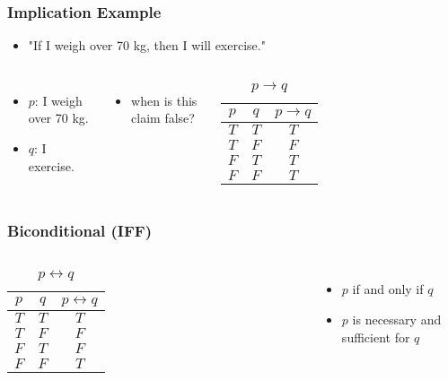 \documentclass[dvipsnames]{beamer}
\begin{document}
\begin{frame}
  \frametitle{Implication Example}

  \begin{itemize}
    \item "If I weigh over 70 kg, then I will exercise."
  \end{itemize}

  \pause
  \begin{columns}
    \begin{itemize}
      \item $p$: I weigh over 70 kg.
      \item $q$: I exercise.
    \end{itemize}

    \pause
    \begin{itemize}
      \item when is this claim false?
    \end{itemize}

    \begin{table}
      \caption{$p \rightarrow q$}
      \begin{tabular}{|c|c||c|}\hline
        $p$ & $q$ & $p \rightarrow q$\\\hline\hline
        $T$ & $T$ & $T$\\\hline
        $T$ & $F$ & $F$\\\hline
        $F$ & $T$ & $T$\\\hline
        $F$ & $F$ & $T$\\\hline
      \end{tabular}
    \end{table}
  \end{columns}
\end{frame}

\begin{frame}
  \frametitle{Biconditional (IFF)}

  \begin{columns}
    \begin{table}
      \caption{$p \leftrightarrow q$}
      \begin{tabular}{|c|c||c|}\hline
        $p$ & $q$ & $p \leftrightarrow q$\\\hline\hline
        $T$ & $T$ & $T$\\\hline
        $T$ & $F$ & $F$\\\hline
        $F$ & $T$ & $F$\\\hline
        $F$ & $F$ & $T$\\\hline
      \end{tabular}
    \end{table}

    \begin{itemize}
      \item $p$ if and only if $q$
      \smallskip
      \item $p$ is necessary and sufficient for $q$
    \end{itemize}
  \end{columns}
\end{frame}
\end{document}
